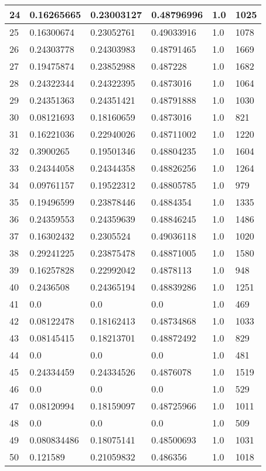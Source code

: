 \begin{longtable}{|l|l|l|l|l|l|}
24 & 0.16265665 & 0.23003127 & 0.48796996 & 1.0 & 1025 \\ \hline 
25 & 0.16300674 & 0.23052761 & 0.49033916 & 1.0 & 1078 \\ \hline 
26 & 0.24303778 & 0.24303983 & 0.48791465 & 1.0 & 1669 \\ \hline 
27 & 0.19475874 & 0.23852988 & 0.487228 & 1.0 & 1682 \\ \hline 
28 & 0.24322344 & 0.24322395 & 0.4873016 & 1.0 & 1064 \\ \hline 
29 & 0.24351363 & 0.24351421 & 0.48791888 & 1.0 & 1030 \\ \hline 
30 & 0.08121693 & 0.18160659 & 0.4873016 & 1.0 & 821 \\ \hline 
31 & 0.16221036 & 0.22940026 & 0.48711002 & 1.0 & 1220 \\ \hline 
32 & 0.3900265 & 0.19501346 & 0.48804235 & 1.0 & 1604 \\ \hline 
33 & 0.24344058 & 0.24344358 & 0.48826256 & 1.0 & 1264 \\ \hline 
34 & 0.09761157 & 0.19522312 & 0.48805785 & 1.0 & 979 \\ \hline 
35 & 0.19496599 & 0.23878446 & 0.4884354 & 1.0 & 1335 \\ \hline 
36 & 0.24359553 & 0.24359639 & 0.48846245 & 1.0 & 1486 \\ \hline 
37 & 0.16302432 & 0.2305524 & 0.49036118 & 1.0 & 1020 \\ \hline 
38 & 0.29241225 & 0.23875478 & 0.48871005 & 1.0 & 1580 \\ \hline 
39 & 0.16257828 & 0.22992042 & 0.4878113 & 1.0 & 948 \\ \hline 
40 & 0.2436508 & 0.24365194 & 0.48839286 & 1.0 & 1251 \\ \hline 
41 & 0.0 & 0.0 & 0.0 & 1.0 & 469 \\ \hline 
42 & 0.08122478 & 0.18162413 & 0.48734868 & 1.0 & 1033 \\ \hline 
43 & 0.08145415 & 0.18213701 & 0.48872492 & 1.0 & 829 \\ \hline 
44 & 0.0 & 0.0 & 0.0 & 1.0 & 481 \\ \hline 
45 & 0.24334459 & 0.24334526 & 0.4876078 & 1.0 & 1519 \\ \hline 
46 & 0.0 & 0.0 & 0.0 & 1.0 & 529 \\ \hline 
47 & 0.08120994 & 0.18159097 & 0.48725966 & 1.0 & 1011 \\ \hline 
48 & 0.0 & 0.0 & 0.0 & 1.0 & 509 \\ \hline 
49 & 0.080834486 & 0.18075141 & 0.48500693 & 1.0 & 1031 \\ \hline 
50 & 0.121589 & 0.21059832 & 0.486356 & 1.0 & 1018 \\ \hline 
\end{longtable}